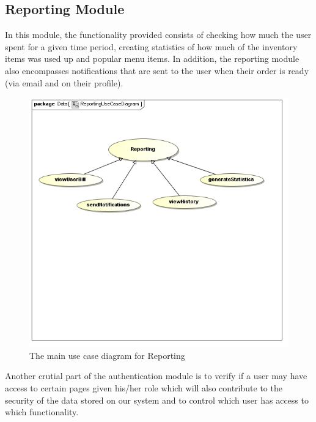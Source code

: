 \documentclass[a4paper,12pt]{report}
\begin{document}
\subsection{Reporting Module}

In this module, the functionality provided consists of checking how much the user spent for a given time period, creating statistics of how much of the inventory items was used up and popular menu items.
In addition, the reporting module also encompasses notifications that are sent to the user when their order is ready (via email and on their profile). 

\begin{figure}[H]
  \centering
    \includegraphics[width=1.0\textwidth]{../images/ReportingUseCaseDiagram.jpg}
    \caption{The main use case diagram for Reporting} 
\end{figure}

Another crutial part of the authentication module is to verify if a user may have access to certain pages given his/her role which will also contribute to the security of the data stored on our system and to control which user has access to which functionality.
\end{document}
